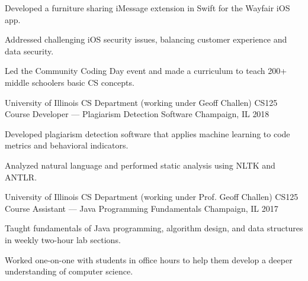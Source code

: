 \begin{cventries}
{\begin{cvitems}
		\item {Developed a furniture sharing iMessage extension in Swift for the Wayfair iOS app.}
		\item {Addressed challenging iOS security issues, balancing customer experience and data security.}
		\item {Led the Community Coding Day event and made a curriculum to teach 200+ middle schoolers basic CS concepts.}
	\end{cvitems}
}
\cventry
{University of Illinois CS Department (working under Geoff Challen)} %
{CS125 Course Developer — Plagiarism Detection Software} %
{Champaign, IL} %
{2018} %
{
	\begin{cvitems} %
		\item {Developed plagiarism detection software that applies machine learning to code metrics and behavioral indicators.}
		\item {Analyzed natural language and performed static analysis using NLTK and ANTLR.}
	\end{cvitems}
}
\cventry
{University of Illinois CS Department (working under Prof. Geoff Challen)} %
{CS125 Course Assistant — Java Programming Fundamentals} %
{Champaign, IL} %
{2017} %
{
	\begin{cvitems} %
	\item {Taught fundamentals of Java programming, algorithm design, and data structures in weekly two-hour lab sections.}
		\item {Worked one-on-one with students in office hours to help them develop a deeper understanding of computer science.}
	\end{cvitems}
}
\end{cventries}
